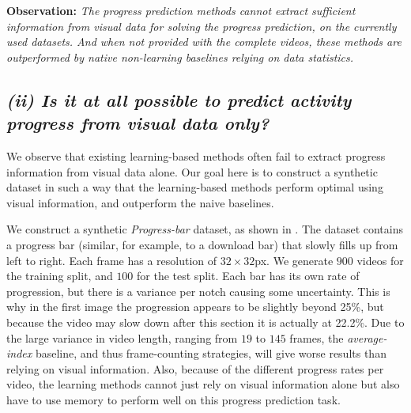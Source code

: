 \smallskip\noindent\textbf{Observation:} \emph{The progress prediction methods cannot extract sufficient information from visual data for solving the progress prediction, on the currently used datasets. And when not provided with the complete videos, these methods are outperformed by native non-learning baselines relying on data statistics.}


\subsection{\emph{\textbf{(ii) Is it at all possible to predict activity progress from visual data only?}}}
We observe that existing learning-based methods often fail to extract progress information from visual data alone. 
Our goal here is to construct a synthetic dataset in such a way that the learning-based methods perform optimal using visual information, and outperform the naive baselines.

We construct a synthetic \textsl{Progress-bar} dataset, as shown in . 
The dataset contains a progress bar (similar, for example, to a download bar) that slowly fills up from left to right. 
Each frame has a resolution of $32{\times}32$px. 
We generate $900$ videos for the training split, and $100$ for the test split.
Each bar has its own rate of progression, but there is a variance per notch causing some uncertainty. 
This is why in the first image the progression appears to be slightly beyond 25\%, but because the video may slow down after this section it is actually at 22.2\%. 
Due to the large variance in video length, ranging from $19$ to $145$ frames, the \textsl{average-index} baseline, and thus frame-counting strategies, will give worse results than relying on visual information.
Also, because of the different progress rates per video, the learning methods cannot just rely on visual information alone but also have to use memory to perform well on this progress prediction task. 


